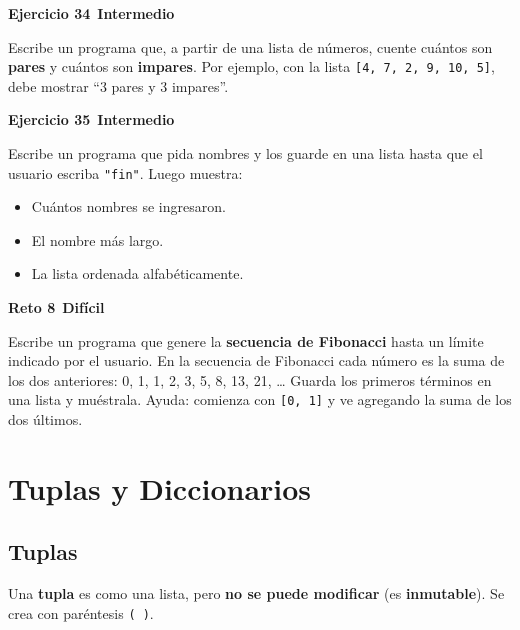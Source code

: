 \documentclass[11pt,a4paper]{article}
\newcommand{\intermedio}{\textcolor{naranjaVivo}{\faIcon{circle}\,\textbf{Intermedio}}}
\newcommand{\dificil}{\textcolor{rojoAlerta}{\faIcon{circle}\,\textbf{Difícil}}}
\begin{document}
\begin{cajaEjercicio}
\textbf{Ejercicio 34} \intermedio

Escribe un programa que, a partir de una lista de números, cuente cuántos son \textbf{pares} y cuántos son \textbf{impares}. Por ejemplo, con la lista \texttt{[4, 7, 2, 9, 10, 5]}, debe mostrar ``3 pares y 3 impares''.
\end{cajaEjercicio}

\begin{cajaEjercicio}
\textbf{Ejercicio 35} \intermedio

Escribe un programa que pida nombres y los guarde en una lista hasta que el usuario escriba \texttt{"fin"}. Luego muestra:
\begin{itemize}
    \item Cuántos nombres se ingresaron.
    \item El nombre más largo.
    \item La lista ordenada alfabéticamente.
\end{itemize}
\end{cajaEjercicio}

\begin{cajaReto}
\textbf{Reto 8} \dificil

Escribe un programa que genere la \textbf{secuencia de Fibonacci} hasta un límite indicado por el usuario. En la secuencia de Fibonacci cada número es la suma de los dos anteriores: 0, 1, 1, 2, 3, 5, 8, 13, 21, \ldots{} Guarda los primeros términos en una lista y muéstrala. Ayuda: comienza con \texttt{[0, 1]} y ve agregando la suma de los dos últimos.
\end{cajaReto}

\section{Tuplas y Diccionarios}

\subsection{Tuplas}

Una \textbf{tupla} es como una lista, pero \textbf{no se puede modificar} (es \textbf{inmutable}). Se crea con paréntesis \texttt{( )}.
\end{document}
